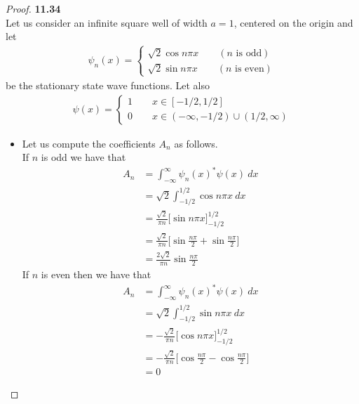 \documentclass[11pt]{article}
\theoremstyle{definition}
\begin{document}
\cleardoublepage
\begin{proof}{\textbf{11.34}}\\
Let us consider an infinite square well of width $a = 1$, centered on the
origin and let 
\begin{align*}
    \psi_n(x) = \begin{cases}
        \sqrt{2}\cos n\pi x \qquad (n\text{ is odd}) \\[6pt]
        \sqrt{2}\sin n\pi x \qquad (n\text{ is even})
    \end{cases}
\end{align*}
be the stationary state wave functions. Let also
\begin{align*}
    \psi(x) = \begin{cases}
        1 \qquad  x \in [-1/2, 1/2] \\[6pt]
        0 \qquad  x \in (-\infty, -1/2) \cup (1/2, \infty)
    \end{cases}
\end{align*}
\begin{itemize}
\item [\textbf{(a)}]
Let us compute the coefficients $A_n$ as follows. \\
If $n$ is odd we have that
\begin{align*}
    A_n &= \int_{-\infty}^\infty \psi_n(x)^*\psi(x) ~dx \\
    &= \sqrt{2}\int_{-1/2}^{1/2} \cos n\pi x ~dx \\
    &= \frac{\sqrt{2}}{\pi n}\bigg[\sin n\pi x\bigg]_{-1/2}^{1/2}\\
    &= \frac{\sqrt{2}}{\pi n}
    \bigg[\sin \frac{n\pi}{2} + \sin \frac{n\pi}{2}\bigg]\\
    &= \frac{2\sqrt{2}}{\pi n}\sin \frac{n\pi}{2}
\end{align*}
If $n$ is even then we have that
\begin{align*}
    A_n &= \int_{-\infty}^\infty \psi_n(x)^*\psi(x) ~dx \\
    &= \sqrt{2}\int_{-1/2}^{1/2} \sin n\pi x ~dx \\
    &= -\frac{\sqrt{2}}{\pi n}\bigg[\cos n\pi x\bigg]_{-1/2}^{1/2}\\
    &= -\frac{\sqrt{2}}{\pi n}
    \bigg[\cos \frac{n\pi}{2} - \cos \frac{n\pi}{2}\bigg]\\
    &= 0
\end{align*}


\end{itemize}
\end{proof}
\end{document}
